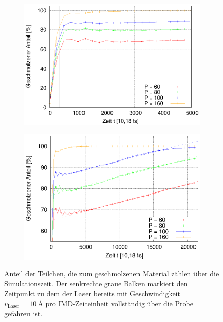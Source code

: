 		\begin{figure}[!ht]
			\centering
			\begin{subfigure}{0.49\textwidth}
				\centering
				\includegraphics[width=\textwidth]{chapter/main/single/plt/power_calibration/cna_vel10_start.eps}
				\label{fig:cna_vel10_start}
			\end{subfigure}
			\begin{subfigure}{0.49\textwidth}
				\centering
				\includegraphics[width=\textwidth]{chapter/main/single/plt/power_calibration/cna_vel10_rate.eps}
				\label{fig:cna_vel10_rate}
			\end{subfigure}
			\caption{Anteil der Teilchen, die zum geschmolzenen Material zählen über die
			Simulationszeit. Der senkrechte graue Balken markiert den Zeitpunkt zu dem der Laser
			bereits mit Geschwindigkeit $v_\text{Laser} = \SI{10}{\angstrom}$ pro IMD-Zeiteinheit
			vollständig über die Probe gefahren ist.}
			\label{fig:cna_vel10}
		\end{figure}

